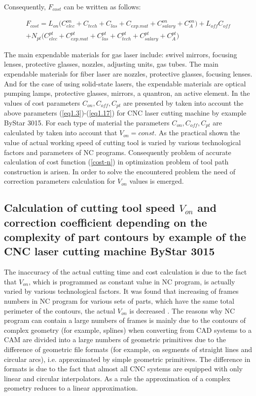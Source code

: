 \documentclass[runningheads]{llncs}
\begin{document}
Consequently, $F_{cost}$
can be written as follows:

\begin{multline}
  \label{eq1.18}
  F_{cost}
  = L_{on} \Big(
    C^{on}_{elec} + C_{tech} + C_{las} + C_{exp.mat} + C^{on}_{salary} + C^{on}_A
    \Big)
  + L_{off} C_{off} \\
  + N_{pt} \Big(
    C^{pt}_{elec} + C^{pt}_{exp.mat} + C^{pt}_{las} + C^{pt}_{tech} + C^{pt}_{salary} + C^{pt}_A
    \Big)
\end{multline}

The main expendable materials for gas laser include:
swivel mirrors, focusing lenses, protective glasses, nozzles, adjusting units, gas tubes.
The main expendable materials for fiber laser are nozzles, protective glasses, focusing lenses.
And for the case of using solid-state lasers,
the expendable materials are
optical pumping lamps, protective glasses, mirrors, a quantron, an active element.
In \cite{ru14} the values of cost parameters
$C_{on}, C_{off}, C_{pt}$
are presented by taken into account the above parameters (\ref{eq1.3})-(\ref{eq1.17})
for CNC laser cutting machine by example ByStar 3015.
For each type of material the parameters $C_{on}, C_{off}, C_{pt}$
are calculated by taken into account that
$V_{on}=const$.
As the practical shown \cite{ru09,Tavaeva2015Nov}
the value of actual working speed of cutting tool
is varied by various technological factors and parameters of NC programs.
Consequently problem of accurate calculation of cost function (\ref{cost-n})
in optimization problem of tool path construction is arisen.
In order to solve the encountered problem
the need of correction parameters calculation for $V_{on}$
values is emerged.

\subsection{Calculation of cutting tool speed $V_{on}$
and correction coefficient depending on the complexity of
part contours by example of the CNC laser cutting machine ByStar 3015}

The inaccuracy of the actual cutting time and cost calculation is due to the fact that $V_{on}$,
which is programmed as constant value in NC program,
is actually varied by various technological factors.
It was found that increasing of frames numbers in NC program
for various sets of parts,
which have the same total perimeter of the contours,
the actual $V_{on}$ is decreased \cite{ru09,Tavaeva2015Nov}.
The reasons why NC program can contain a large numbers of frames
is mainly due to the contours of complex geometry (for example, splines)
when converting from CAD systems to a CAM
are divided into a large numbers of geometric primitives
due to the difference of geometric file formats
(for example, on segments of straight lines and circular arcs),
i.e. approximated by simple geometric primitives.
The difference in formats is due to the fact that
almost all CNC systems are equipped with only linear and circular interpolators.
As a rule the approximation of a complex geometry reduces to a linear approximation.
\end{document}
